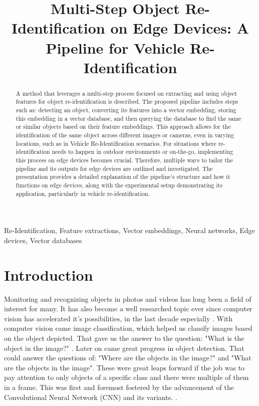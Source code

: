 \documentclass[conference]{IEEEtran} %
\title{Multi-Step Object Re-Identification on Edge Devices: A Pipeline for Vehicle Re-Identification}
\author{
	\IEEEauthorblockN{Tomass Zutis, Anzelika Bureka, Janis Judvaitis, Janis Arents, Modris Greitans, Peteris Racinskis}
	\IEEEauthorblockA{
		Institute of Electronics and Computer Science, Latvia\\
		janis.arents@edi.lv
	}
}
\begin{document}
	
	\maketitle
	
	\begin{abstract}
A method that leverages a multi-step process focused on extracting and using object features for object re-identification is described. The proposed pipeline includes steps such as: detecting an object, converting its features into a vector embedding, storing this embedding in a vector database, and then querying the database to find the same or similar objects based on their feature embeddings. This approach allows for the identification of the same object across different images or cameras, even in varying locations, such as in Vehicle Re-Identification scenarios. For situations where re-identification needs to happen in outdoor environments or on-the-go, implementing this process on edge devices becomes crucial. Therefore, multiple ways to tailor the pipeline and its outputs for edge devices are outlined and investigated. The presentation provides a detailed explanation of the pipeline’s structure and how it functions on edge devices, along with the experimental setup demonstrating its application, particularly in vehicle re-identification.
	\end{abstract}
	
	\begin{IEEEkeywords}
		Re-Identification, Feature extractions, Vector embeddings, Neural networks, Edge devices, Vector 
		databases
	\end{IEEEkeywords}
	
	\section{Introduction}

Monitoring and recognizing objects in photos and videos has long been a field of interest for many. It has also become a well researched topic ever since computer vision has accelerated it's possibilities, in the last decade especially  \cite{prince2012computer}.
 With computer vision came image classification, which helped us classify images based on the object depicted. That gave us the answer to the question: "What is the object in the image?" \cite{lu2007survey}.
  Later on came great progress in object detection. That could answer the questions of: "Where are the objects in the image?" and "What are the objects in the image". These were great leaps forward if the job was to pay attention to only objects of a specific class and there were multiple of them in a frame. This was first and foremost fostered by the advancement of the Convolutional Neural Network (CNN) and its variants. \cite{du2018understanding}.
  
\end{document}
